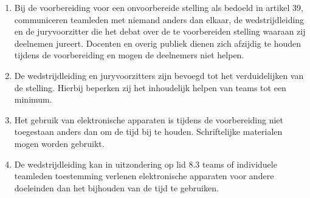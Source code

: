 
\begin{enumerate}
\item Bij de voorbereiding voor een onvoorbereide stelling als bedoeld in artikel 39, communiceren teamleden met niemand anders dan elkaar, de wedstrijdleiding en de juryvoorzitter die het debat over de te voorbereiden stelling waaraan zij deelnemen jureert. Docenten en overig publiek dienen zich afzijdig te houden tijdens de voorbereiding en mogen de deelnemers niet helpen. 
\item De wedstrijdleiding en juryvoorzitters zijn bevoegd tot het verduidelijken van de stelling. Hierbij beperken zij het inhoudelijk helpen van teams tot een minimum. 
\item Het gebruik van elektronische apparaten is tijdens de voorbereiding niet toegestaan anders dan om de tijd bij te houden. Schriftelijke materialen mogen worden gebruikt. 
\item De wedstrijdleiding kan in uitzondering op lid 8.3 teams of individuele teamleden toestemming verlenen elektronische apparaten voor andere doeleinden dan het bijhouden van de tijd te gebruiken. 
\end{enumerate}
